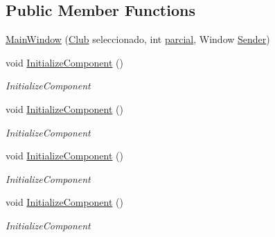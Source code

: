 \subsection*{Public Member Functions}
\begin{DoxyCompactItemize}
\item 
\hyperlink{class_asistencias__wpf_1_1_main_window_a773508c45ca6432097868c52f9cc53a4}{Main\-Window} (\hyperlink{class_asistencias__wpf_1_1_club}{Club} seleccionado, int \hyperlink{class_asistencias__wpf_1_1_main_window_ac8fa133c53bfc0374475a1efb34409c9}{parcial}, Window \hyperlink{class_asistencias__wpf_1_1_main_window_a4e35f0ebc45164d603bcc80544bc2bc1}{Sender})
\item 
void \hyperlink{class_asistencias__wpf_1_1_main_window_af25d88d6be17f127720a8e9d0459a4a8}{Initialize\-Component} ()
\begin{DoxyCompactList}\small\item\em Initialize\-Component \end{DoxyCompactList}\item 
void \hyperlink{class_asistencias__wpf_1_1_main_window_af25d88d6be17f127720a8e9d0459a4a8}{Initialize\-Component} ()
\begin{DoxyCompactList}\small\item\em Initialize\-Component \end{DoxyCompactList}\item 
void \hyperlink{class_asistencias__wpf_1_1_main_window_af25d88d6be17f127720a8e9d0459a4a8}{Initialize\-Component} ()
\begin{DoxyCompactList}\small\item\em Initialize\-Component \end{DoxyCompactList}\item 
void \hyperlink{class_asistencias__wpf_1_1_main_window_af25d88d6be17f127720a8e9d0459a4a8}{Initialize\-Component} ()
\begin{DoxyCompactList}\small\item\em Initialize\-Component \end{DoxyCompactList}\end{DoxyCompactItemize}
